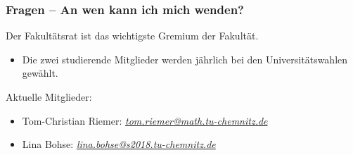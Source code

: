 \documentclass[10pt]{beamer}
\makeatletter
\newcommand{\highl}[1]{\color{tuccolor@ma}#1\color{black}}
\makeatother
\begin{document}
\begin{frame}
	\frametitle{Fragen -- An wen kann ich mich wenden?}

	\begin{block}{\vphantom{X}}
		Der Fakultätsrat ist das wichtigste Gremium der Fakultät.
	\end{block}

	\begin{itemize}
		\item Die zwei studierende Mitglieder werden jährlich bei den Universitätswahlen gewählt.
	\end{itemize} 

	\vspace*{1.0cm}

	Aktuelle Mitglieder:

	\begin{itemize}
		\item Tom-Christian Riemer: \highl{\textit{\href{mailto:tom.riemer@math.tu-chemnitz.de}{tom.riemer@math.tu-chemnitz.de}}}
		\item Lina Bohse: \highl{\textit{\href{mailto:lina.bohse@s2018.tu-chemnitz.de}{lina.bohse@s2018.tu-chemnitz.de}}}
	\end{itemize}
\end{frame}
\end{document}
